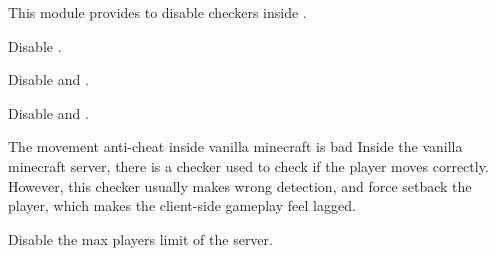 This module provides  to disable checkers inside .

Disable .

Disable  and .

Disable  and .

\begin{warn}{The movement anti-cheat inside vanilla minecraft is bad}
    Inside the vanilla minecraft server, there is a checker used to check if the player moves correctly.
    However, this checker usually makes wrong detection, and force setback the player, which makes the client-side gameplay feel lagged.
\end{warn}

Disable the max players limit of the server.
